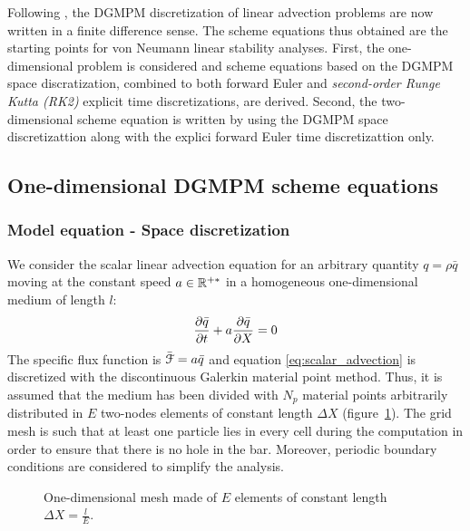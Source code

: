 Following \cite{Hirsch}, the DGMPM discretization of linear advection problems are now written in a finite difference sense. The scheme equations thus obtained are the starting points for von Neumann linear stability analyses. First, the one-dimensional problem is considered and scheme equations based on the DGMPM space discratization, combined to both forward Euler and \textit{second-order Runge Kutta (RK2)} explicit time discretizations, are derived. Second, the two-dimensional scheme equation is written by using the DGMPM space discretizattion along with the explici forward Euler time discretizattion only.

\subsection{One-dimensional DGMPM scheme equations}
\subsubsection*{Model equation - Space discretization}
We consider the scalar linear advection equation for an arbitrary quantity $q=\rho \bar{q}$ moving at the constant speed $a \in \mathbb{R}^{+*}$ in a homogeneous one-dimensional medium of length $l$:
\begin{equation}
\frac{\partial \bar{q}}{\partial t} + a\frac{\partial \bar{q}}{\partial X} = 0 \label{eq:scalar_advection}
\end{equation}
The specific flux function is $\bar{\mathcal{F}} = a\bar{q}$ and equation \eqref{eq:scalar_advection} is discretized with the discontinuous Galerkin material point method. Thus, it is assumed that the medium has been divided with $N_p$ material points arbitrarily distributed in $E$ two-nodes elements of constant length $\Delta X$ (figure~\ref{fig:1Dmesh}). The grid mesh is such that at least one particle lies in every cell during the computation in order to ensure that there is no hole in the bar. Moreover, periodic boundary conditions are considered to simplify the analysis.
\begin{figure}[h!]
  \centering

  \caption{One-dimensional mesh made of $E$ elements of constant length $\Delta X = \frac{l}{E}$.}\label{fig:1Dmesh}
\end{figure}

